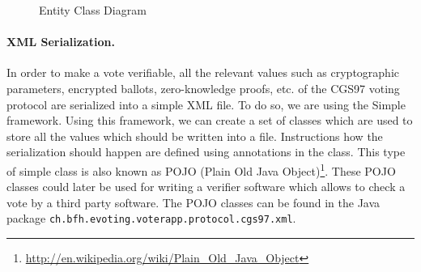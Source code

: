 \documentclass[numbers=noenddot, abstract=on, a4paper, headsepline,
footsepline, oneside, draft=off]{scrreprt}
\begin{document}
\begin{figure}[htbp]
	\centering
	\caption{Entity Class Diagram}
	\label{fig:entities}
\end{figure}

\paragraph{XML Serialization.} In order to make a vote verifiable, all the
relevant values such as cryptographic parameters, encrypted ballots, zero-knowledge proofs, etc. of the
CGS97 voting protocol are serialized into a simple XML file. To do so, we are
using the Simple framework. Using this framework, we can create a set of classes
which are used to store all the values which should be written into a file.
Instructions how the serialization should happen are defined using annotations
in the class. This type of simple class is also known as POJO (Plain Old Java
Object)\footnote{\url{http://en.wikipedia.org/wiki/Plain_Old_Java_Object}}.
These POJO classes could later be used for writing a verifier software which
allows to check a vote by a third party software. The POJO classes can be found
in the Java package \texttt{ch.bfh.evoting.voterapp.protocol.cgs97.xml}.
\end{document}

